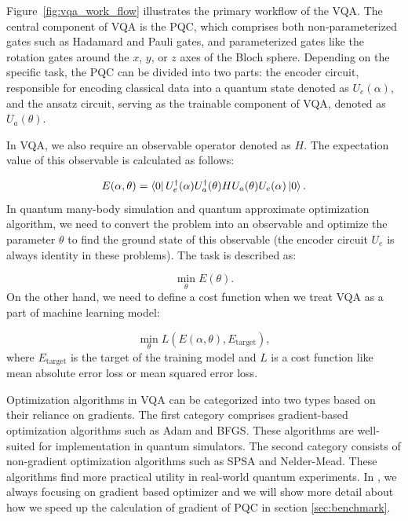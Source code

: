 Figure~\ref{fig:vqa_work_flow} illustrates the primary workflow of the VQA. The central component of VQA is the PQC, which comprises both non-parameterized gates such as Hadamard and Pauli gates, and parameterized gates like the rotation gates around the $x$, $y$, or $z$ axes of the Bloch sphere. Depending on the specific task, the PQC can be divided into two parts: the encoder circuit, responsible for encoding classical data into a quantum state denoted as $U_e(\alpha)$, and the ansatz circuit, serving as the trainable component of VQA, denoted as $U_a(\theta)$.

In VQA, we also require an observable operator denoted as $H$. The expectation value of this observable is calculated as follows:

\begin{equation}
  E(\alpha, \theta) = \bra{0}U_e^\dagger(\alpha)U_a^\dagger(\theta)HU_a(\theta)U_e(\alpha)\ket{0}.
\end{equation}
In quantum many-body simulation and quantum approximate optimization algorithm, we need to convert the problem into an observable and optimize the parameter $\theta$ to find the ground state of this observable (the encoder circuit $U_e$ is always identity in these problems). The task is described as:

\begin{equation}
  \min_\theta E(\theta).
\end{equation}
On the other hand, we need to define a cost function when we treat VQA as a part of machine learning model:

\begin{equation}
  \min_\theta L(E(\alpha, \theta), E_\text{target}),
\end{equation}
where $E_\text{target}$ is the target of the training model and $L$ is a cost function like mean absolute error loss or mean squared error loss.

Optimization algorithms in VQA can be categorized into two types based on their reliance on gradients. The first category comprises gradient-based optimization algorithms such as Adam and BFGS. These algorithms are well-suited for implementation in quantum simulators. The second category consists of non-gradient optimization algorithms such as SPSA and Nelder-Mead. These algorithms find more practical utility in real-world quantum experiments. In \MindQuantum, we always focusing on gradient based optimizer and we will show more detail about how we speed up the calculation of gradient of PQC in section \ref{sec:benchmark}.

